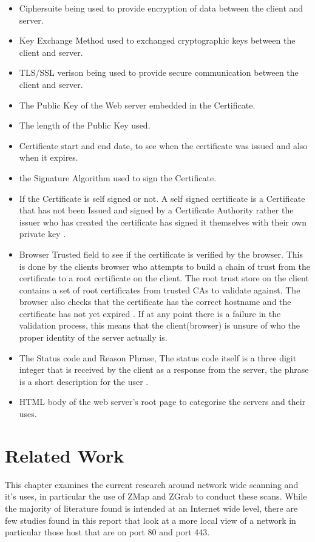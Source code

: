 \documentclass[a4wide,leqno,12pt]{report}
\begin{document}
\begin{itemize}
  \item Ciphersuite being used to provide encryption of data between the client and server.
  \item Key Exchange Method used to exchanged cryptographic keys between the client and server.
  \item TLS/SSL verison being used to provide secure communication between the client and server.
  \item The Public Key of the Web server embedded in the Certificate.
  \item The length of the Public Key used.
  \item Certificate start and end date, to see when the certificate was issued and also when it expires.
  \item the Signature Algorithm used to sign the Certificate.
  \item If the Certificate is self signed or not.
  A self signed certificate is a Certificate that has not been Issued and signed by a Certificate Authority rather the issuer who has created the certificate has signed it themselves with their own private key \cite{housley1998internet}.
  \item Browser Trusted field to see if the certificate is verified by the browser. This is done by the clients browser who attempts to build a chain of trust from the certificate to a root certificate on the client. The root trust store on the client contains a set of root certificates from trusted CAs to validate against. The browser also checks that the certificate has the correct hostname and the certificate has not yet expired \cite{acer2017wild}. If at any point there is a failure in the validation process, this means that the client(browser) is unsure of who the proper identity of the server actually is. 
  \item The Status code and Reason Phrase, The status code itself is a three digit integer that is received by the client as a response from the server, the phrase is a short description for the user \cite{fielding1999hypertext} \cite{berners1996hypertext}.
  \item HTML body of the web server's root page to categorise the servers and their uses.

\end{itemize}


\chapter{Related Work}
This chapter examines the current research around network wide scanning and it's uses, in particular the use of ZMap and ZGrab to conduct these scans. While the majority of literature found is intended at an Internet wide level, there are few studies found in this report that look at a more local view of a network in particular those host that are on port 80 and port 443.
\end{document}
